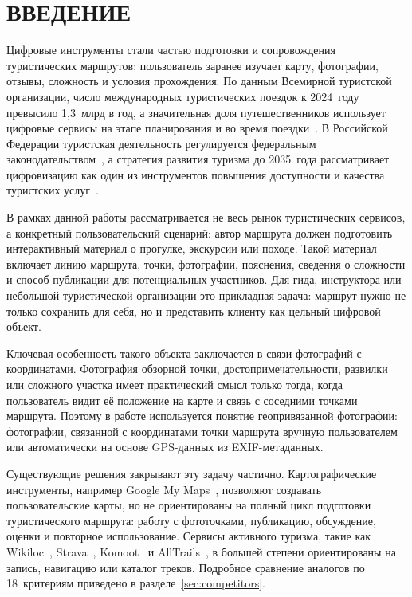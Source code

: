 \chapter*{ВВЕДЕНИЕ}

Цифровые инструменты стали частью подготовки и сопровождения туристических
маршрутов: пользователь заранее изучает карту, фотографии, отзывы, сложность и
условия прохождения. По данным Всемирной туристской организации, число
международных туристических поездок к 2024~году превысило 1,3~млрд в год, а
значительная доля путешественников использует цифровые сервисы на этапе
планирования и во время поездки~\cite{unwto2024}. В Российской Федерации
туристская деятельность регулируется федеральным законодательством~\cite{tourismLaw132},
а стратегия развития туризма до 2035~года рассматривает цифровизацию как один
из инструментов повышения доступности и качества туристских услуг~\cite{tourismStrategy2035}.

В рамках данной работы рассматривается не весь рынок туристических сервисов, а
конкретный пользовательский сценарий: автор маршрута должен подготовить
интерактивный материал о прогулке, экскурсии или походе. Такой материал включает
линию маршрута, точки, фотографии, пояснения, сведения о сложности и способ
публикации для потенциальных участников. Для гида, инструктора или небольшой
туристической организации это прикладная задача: маршрут нужно не только
сохранить для себя, но и представить клиенту как цельный цифровой объект.

Ключевая особенность такого объекта заключается в связи фотографий с координатами.
Фотография обзорной точки, достопримечательности, развилки или сложного участка
имеет практический смысл только тогда, когда пользователь видит её положение на
карте и связь с соседними точками маршрута. Поэтому в работе используется понятие
геопривязанной фотографии: фотографии, связанной с координатами точки маршрута
вручную пользователем или автоматически на основе GPS-данных из EXIF-метаданных.

Существующие решения закрывают эту задачу частично. Картографические инструменты,
например Google My Maps~\cite{googlemymaps}, позволяют создавать пользовательские
карты, но не ориентированы на полный цикл подготовки туристического маршрута:
работу с фототочками, публикацию, обсуждение, оценки и повторное использование.
Сервисы активного туризма, такие как Wikiloc~\cite{wikiloc}, Strava~\cite{strava},
Komoot~\cite{komoot} и AllTrails~\cite{alltrails}, в большей степени ориентированы
на запись, навигацию или каталог треков. Подробное сравнение аналогов по
18~критериям приведено в разделе~\ref{sec:competitors}.

